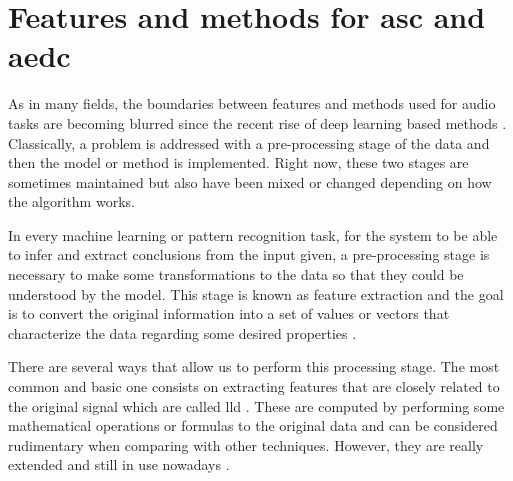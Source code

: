 
\section{Features and methods for \acrshort{asc} and \acrshort{aedc}}
\label{section:features-and-methods-for-asc-aedc}
	
	As in many fields, the boundaries between features and methods used for audio tasks are becoming blurred since the recent rise of deep learning based methods . Classically, a problem is addressed with a pre-processing stage of the data and then the model or method is implemented. Right now, these two stages are sometimes maintained but also have been mixed or changed depending on how the algorithm works.


	In every machine learning or pattern recognition task, for the system to be able to infer and extract conclusions from the input given, a pre-processing stage is necessary to make some transformations to the data so that they could be understood by the model. This stage is known as feature extraction and the goal is to convert the original information into a set of values or vectors that characterize the data regarding some desired properties \cite{Giannakopoulos2014}.
	
	There are several ways that allow us to perform this processing stage. The most common and basic one consists on extracting features that are closely related to the original signal which are called \acrfull{lld}  \cite{Amatriain2004}. These are computed by performing some mathematical operations or formulas to the original data and can be considered rudimentary when comparing with other techniques. However, they are really extended and still in use nowadays \cite{Marr1982}. 

